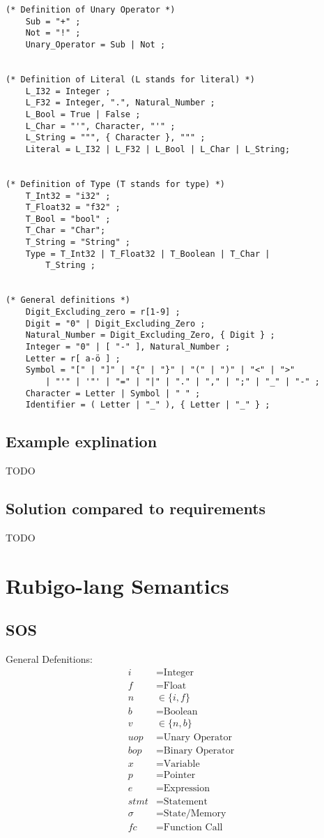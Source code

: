 \documentclass[12pt]{article}
\begin{document}
\begin{verbatim}
(* Definition of Unary Operator *)
    Sub = "+" ;
    Not = "!" ;
    Unary_Operator = Sub | Not ;


(* Definition of Literal (L stands for literal) *)
    L_I32 = Integer ;
    L_F32 = Integer, ".", Natural_Number ;
    L_Bool = True | False ;
    L_Char = "'", Character, "'" ;
    L_String = """, { Character }, """ ;  
    Literal = L_I32 | L_F32 | L_Bool | L_Char | L_String;


(* Definition of Type (T stands for type) *)
    T_Int32 = "i32" ;
    T_Float32 = "f32" ;
    T_Bool = "bool" ;
    T_Char = "Char";
    T_String = "String" ;  
    Type = T_Int32 | T_Float32 | T_Boolean | T_Char |
        T_String ;


(* General definitions *)
    Digit_Excluding_zero = r[1-9] ;
    Digit = "0" | Digit_Excluding_Zero ;
    Natural_Number = Digit_Excluding_Zero, { Digit } ;
    Integer = "0" | [ "-" ], Natural_Number ;
    Letter = r[ a-ö ] ;
    Symbol = "[" | "]" | "{" | "}" | "(" | ")" | "<" | ">"
        | "'" | '"' | "=" | "|" | "." | "," | ";" | "_" | "-" ;
    Character = Letter | Symbol | " " ;
    Identifier = ( Letter | "_" ), { Letter | "_" } ;
	\end{verbatim}

    \subsection{Example explination}
 	TODO

    \subsection{Solution compared to requirements}
 	TODO


    \section{Rubigo-lang Semantics}
    \subsection{SOS}
	General Defenitions:
    	\begin{align*}
		i &= \text{Integer} \\
		f &= \text{Float} \\
		n &\in \{i, f\} \\
		b &= \text{Boolean} \\
		v &\in \{n, b\} \\
		uop &= \text{Unary Operator} \\
		bop &= \text{Binary Operator} \\
		x &= \text{Variable} \\
		p &= \text{Pointer} \\
		e &= \text{Expression} \\
		stmt &= \text{Statement} \\
		\sigma &= \text{State/Memory} \\
		fc &= \text{Function Call} \\
	\end{align*}
\end{document}
